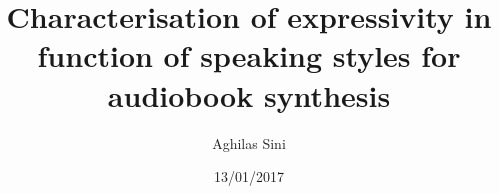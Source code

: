 \documentclass{beamer}
\title[Background and Literature]{Characterisation of  expressivity  in  function  of  speaking  styles  for  audiobook
synthesis }
\author{Aghilas Sini}
\institute{Université de Rennes 1}
\date{13/01/2017}
\begin{document}
\begin{frame}
  \titlepage
\end{frame}

%
%
%
%
%	
%
%
\end{document}
